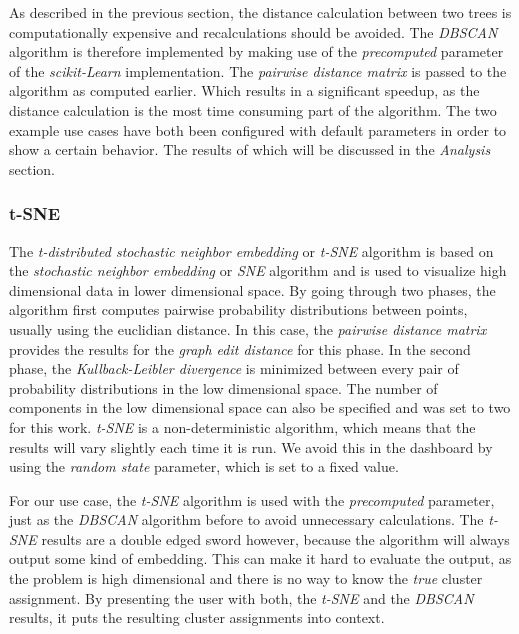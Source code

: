 \documentclass[a4paper, 12pt]{article}
\begin{document}
As described in the previous section, the distance calculation between two trees is computationally
expensive and recalculations should be avoided. The \textit{DBSCAN} algorithm is therefore
implemented by making use of the \textit{precomputed} parameter of the \textit{scikit-Learn}
implementation. The \textit{pairwise distance matrix} is passed to the algorithm as computed
earlier. Which results in a significant speedup, as the distance calculation is the most time
consuming part of the algorithm. The two example use cases have both been configured with default
parameters in order to show a certain behavior. The results of which will be discussed in the
\textit{Analysis} section. \par

\subsubsection{t-SNE}
The \textit{t-distributed stochastic neighbor embedding} or \textit{t-SNE} algorithm is based on
the \textit{stochastic neighbor embedding} or \textit{SNE} \cite{hinton2002stochastic} algorithm
and is used to visualize high dimensional data in lower dimensional space. By going through two
phases, the algorithm first computes pairwise probability distributions between points, usually
using the euclidian distance. In this case, the \textit{pairwise distance matrix} provides the
results for the \textit{graph edit distance} for this phase. In the second phase, the
\textit{Kullback-Leibler divergence} \cite{csiszar1975divergence} is minimized between every pair
of probability distributions in the low dimensional space. The number of components in the low
dimensional space can also be specified and was set to two for this work.
\textit{t-SNE} is a non-deterministic algorithm, which means that the results will vary slightly
each time it is run. We avoid this in the dashboard by using the \textit{random state} parameter,
which is set to a fixed value. \par
For our use case, the \textit{t-SNE} algorithm is used with the \textit{precomputed} parameter,
just as the \textit{DBSCAN} algorithm before to avoid unnecessary calculations.
The \textit{t-SNE} results are a double edged sword however, because the algorithm will always
output some kind of embedding. This can make it hard to evaluate the output, as the problem is
high dimensional and there is no way to know the \textit{true} cluster assignment.
By presenting the user with both, the \textit{t-SNE} and the \textit{DBSCAN} results, it puts the
resulting cluster assignments into context.
\end{document}
